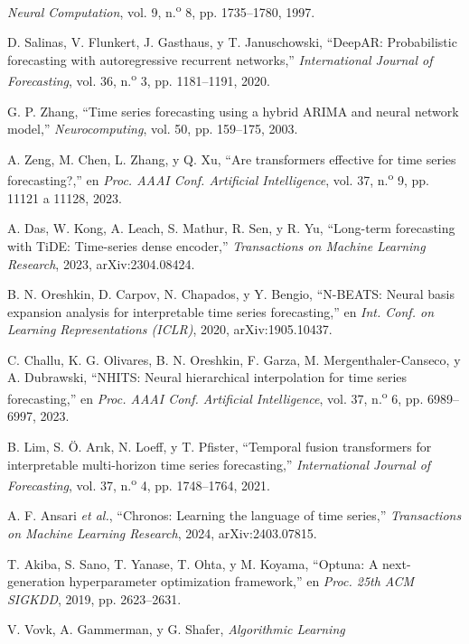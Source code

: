 \documentclass[12pt,letterpaper]{report}
\begin{document}
\begin{enumerate}[label={[\arabic*]}, leftmargin=*, itemsep=2pt]
\textit{Neural Computation}, vol. 9, n.\textsuperscript{o} 8, pp. 1735--1780, 1997.
\item\label{bib:34} D. Salinas, V. Flunkert, J. Gasthaus, y T. Januschowski,
``DeepAR: Probabilistic forecasting with autoregressive recurrent networks,''
\textit{International Journal of Forecasting}, vol. 36, n.\textsuperscript{o} 3,
pp. 1181--1191, 2020.
\item\label{bib:35} G. P. Zhang, ``Time series forecasting using a hybrid ARIMA and
neural network model,'' \textit{Neurocomputing}, vol. 50, pp. 159--175, 2003.
\item\label{bib:36} A. Zeng, M. Chen, L. Zhang, y Q. Xu, ``Are transformers effective for time series forecasting?,'' en \textit{Proc. AAAI Conf. Artificial Intelligence}, vol. 37, n.\textsuperscript{o} 9, pp. 11121 a 11128, 2023.
\item\label{bib:37} A. Das, W. Kong, A. Leach, S. Mathur, R. Sen, y R. Yu, ``Long-term forecasting with TiDE: Time-series dense encoder,'' \textit{Transactions on Machine Learning Research}, 2023, arXiv:2304.08424.
\item\label{bib:38} B. N. Oreshkin, D. Carpov, N. Chapados, y Y. Bengio, ``N-BEATS: Neural basis expansion analysis for interpretable time series forecasting,'' en \textit{Int. Conf. on Learning Representations (ICLR)}, 2020, arXiv:1905.10437.
\item\label{bib:39} C. Challu, K. G. Olivares, B. N. Oreshkin, F. Garza, M. Mergenthaler-Canseco, y A. Dubrawski, ``NHITS: Neural hierarchical interpolation for time series forecasting,'' en \textit{Proc. AAAI Conf. Artificial Intelligence}, vol. 37, n.\textsuperscript{o} 6, pp. 6989--6997, 2023.
\item\label{bib:40} B. Lim, S. Ö. Ar{\i}k, N. Loeff, y T. Pfister, ``Temporal fusion transformers for interpretable multi-horizon time series forecasting,'' \textit{International Journal of Forecasting}, vol. 37, n.\textsuperscript{o} 4, pp. 1748--1764, 2021.
\item\label{bib:41} A. F. Ansari \textit{et al.}, ``Chronos: Learning the language of time series,'' \textit{Transactions on Machine Learning Research}, 2024, arXiv:2403.07815.
\item\label{bib:42} T. Akiba, S. Sano, T. Yanase, T. Ohta, y M. Koyama, ``Optuna: A
next-generation hyperparameter optimization framework,'' en \textit{Proc. 25th ACM
SIGKDD}, 2019, pp. 2623--2631.
\item\label{bib:43} V. Vovk, A. Gammerman, y G. Shafer, \textit{Algorithmic Learning
}
\end{enumerate}
\end{document}
